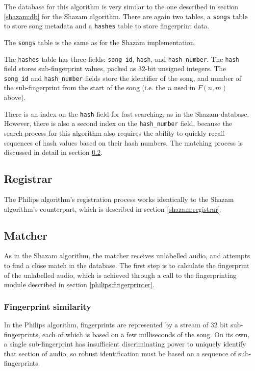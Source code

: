 \documentclass[12pt,a4paper,twoside,openright]{report}
\begin{document}
The database for this algorithm is very similar to the one described in section \ref{shazam:db} for the Shazam algorithm. There are again two tables, a \lstinline{songs} table to store song metadata and a \lstinline{hashes} table to store fingerprint data.

The \lstinline{songs} table is the same as for the Shazam implementation.

The \lstinline{hashes} table has three fields: \lstinline{song_id}, \lstinline{hash}, and \lstinline{hash_number}. The \lstinline{hash} field stores sub-fingerprint values, packed as 32-bit unsigned integers. The \lstinline{song_id} and \lstinline{hash_number} fields store the identifier of the song, and number of the sub-fingerprint from the start of the song (i.e. the $n$ used in $F(n,m)$ above).

There is an index on the \lstinline{hash} field for fast searching, as in the Shazam database. However, there is also a second index on the \lstinline{hash_number} field, because the search process for this algorithm also requires the ability to quickly recall sequences of hash values based on their hash numbers. The matching process is discussed in detail in section \ref{philips:matcher}.


\subsection{Registrar}

The Philips algorithm's registration process works identically to the Shazam algorithm's counterpart, which is described in section \ref{shazam:registrar}.


\subsection{Matcher}
\label{philips:matcher}

As in the Shazam algorithm, the matcher receives unlabelled audio, and attempts to find a close match in the database. The first step is to calculate the fingerprint of the unlabelled audio, which is achieved through a call to the fingerprinting module described in section \ref{philips:fingerprinter}.

\subsubsection{Fingerprint similarity}

In the Philips algorithm, fingerprints are represented by a stream of 32 bit sub-fingerprints, each of which is based on a few milliseconds of the song. On its own, a single sub-fingerprint has insufficient discriminating power to uniquely identify that section of audio, so robust identification must be based on a sequence of sub-fingerprints.
\end{document}
